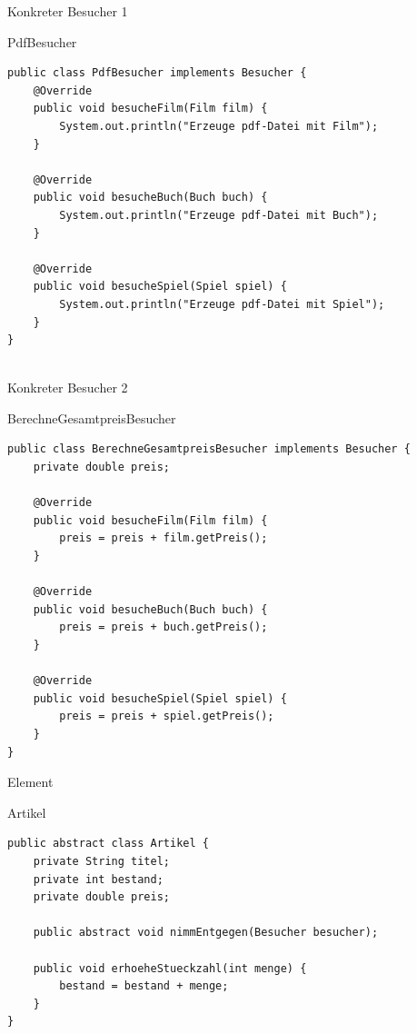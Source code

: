 \begin{frame}[fragile]{Konkreter Besucher 1}
	\begin{exampleblock}{PdfBesucher}
 		\begin{lstlisting}
public class PdfBesucher implements Besucher {
	@Override
	public void besucheFilm(Film film) {
		System.out.println("Erzeuge pdf-Datei mit Film");
	}

	@Override
	public void besucheBuch(Buch buch) {
		System.out.println("Erzeuge pdf-Datei mit Buch");
	}

	@Override
	public void besucheSpiel(Spiel spiel) {
		System.out.println("Erzeuge pdf-Datei mit Spiel");
	}
}
 		    
 		\end{lstlisting}
 	\end{exampleblock}
\end{frame}

\begin{frame}[fragile]{Konkreter Besucher 2}
	\begin{exampleblock}{BerechneGesamtpreisBesucher}
 		\begin{lstlisting}
public class BerechneGesamtpreisBesucher implements Besucher {
	private double preis;
	
	@Override
	public void besucheFilm(Film film) {
		preis = preis + film.getPreis();
	}

	@Override
	public void besucheBuch(Buch buch) {
		preis = preis + buch.getPreis();
	}

	@Override
	public void besucheSpiel(Spiel spiel) {
		preis = preis + spiel.getPreis();
	}
} 		    
 		\end{lstlisting}
 	\end{exampleblock}
\end{frame}

\begin{frame}[fragile]{Element}
	\begin{exampleblock}{Artikel}
 		\begin{lstlisting}
public abstract class Artikel {
	private String titel;
	private int bestand;
	private double preis;
	
	public abstract void nimmEntgegen(Besucher besucher);

	public void erhoeheStueckzahl(int menge) {
		bestand = bestand + menge;
	}
} 		    
 		\end{lstlisting}
 	\end{exampleblock}
\end{frame}

